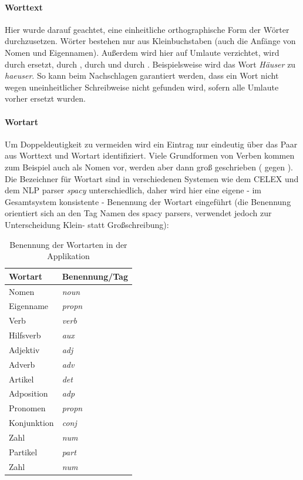 \paragraph{Worttext}
Hier wurde darauf geachtet, eine einheitliche orthographische Form der Wörter durchzusetzen. Wörter bestehen nur aus Kleinbuchstaben (auch die Anfänge von Nomen und Eigennamen). Außerdem wird hier auf Umlaute verzichtet,  wird durch  ersetzt,  durch ,  durch  und  durch . Beispielsweise wird das Wort \textit{Häuser} zu \textit{haeuser}. So kann beim Nachschlagen garantiert werden, dass ein Wort nicht wegen uneinheitlicher Schreibweise nicht gefunden wird, sofern alle Umlaute vorher ersetzt wurden.

\paragraph{Wortart}
Um Doppeldeutigkeit zu vermeiden wird ein Eintrag nur eindeutig über das Paar aus Worttext und Wortart identifiziert. Viele Grundformen von Verben kommen zum Beispiel auch als Nomen vor, werden aber dann groß geschrieben ( gegen ). Die Bezeichner für Wortart sind in verschiedenen Systemen wie dem CELEX und dem NLP parser \textit{spacy} unterschiedlich, daher wird hier eine eigene - im Gesamtsystem konsistente - Benennung der Wortart eingeführt (die Benennung orientiert sich an den Tag Namen des spacy parsers, verwendet jedoch zur Unterscheidung Klein- statt Großschreibung):

\begin{table}[h!]
	\centering
	\begin{tabular}{|l|l|}
		\hline
		Wortart & Benennung/Tag \\
		\hline
		\hline
		Nomen & \textit{noun}\\
		Eigenname & \textit{propn}\\
		Verb & \textit{verb}\\
		Hilfsverb & \textit{aux}\\
		Adjektiv & \textit{adj}\\
		Adverb & \textit{adv}\\
		Artikel & \textit{det}\\
		Adposition & \textit{adp}\\
		Pronomen & \textit{propn}\\
		Konjunktion & \textit{conj}\\
		Zahl & \textit{num}\\
		Partikel & \textit{part}\\
		Zahl & \textit{num}\\
		\hline
	\end{tabular}
	\caption{Benennung der Wortarten in der Applikation}
\end{table}

